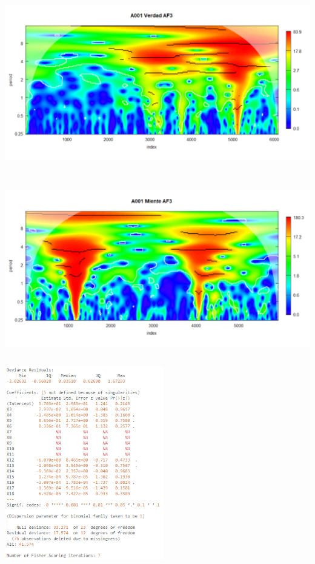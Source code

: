 \begin{center}
\includegraphics[height=3.0in]{figuras/Imagen9.png}
\end{center}

\begin{center}
\includegraphics[height=3.0in]{figuras/Imagen10.png}
\end{center}

\begin{center}
\includegraphics[height=3.3in]{figuras/Capture4.PNG}
\end{center}

